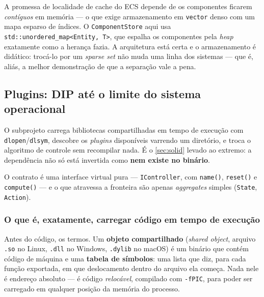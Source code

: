 \begin{armadilha}
A promessa de localidade de cache do ECS depende de os componentes ficarem
\emph{contíguos} em memória --- o que exige armazenamento em \texttt{vector}
denso com um mapa esparso de índices. O \texttt{ComponentStore} aqui usa
\texttt{std::unordered\_map<Entity, T>}, que espalha os componentes pela
\emph{heap} exatamente como a herança fazia. A arquitetura está certa e o
armazenamento é didático: trocá-lo por um \emph{sparse set} não muda uma linha
dos sistemas --- que é, aliás, a melhor demonstração de que a separação vale a
pena.
\end{armadilha}

\subsection{Plugins: DIP até o limite do sistema operacional}
\label{sec:plugin-registry}

O subprojeto  carrega bibliotecas compartilhadas em
tempo de execução com \texttt{dlopen}/\texttt{dlsym}, descobre os
\emph{plugins} disponíveis varrendo um diretório, e troca o algoritmo de
controle sem recompilar nada. É o \cref{sec:solid} levado ao extremo: a
dependência não só está invertida como \textbf{nem existe no binário}.

O contrato é uma interface virtual pura --- \texttt{IController}, com
\texttt{name()}, \texttt{reset()} e \texttt{compute()} --- e o que atravessa a
fronteira são apenas \emph{aggregates} simples (\texttt{State},
\texttt{Action}).

\subsubsection{O que é, exatamente, carregar código em tempo de execução}

Antes do código, os termos. Um \textbf{objeto compartilhado} (\emph{shared
object}, arquivo \texttt{.so} no Linux, \texttt{.dll} no Windows,
\texttt{.dylib} no macOS) é um binário que contém código de máquina e uma
\textbf{tabela de símbolos}: uma lista que diz, para cada função exportada, em
que deslocamento dentro do arquivo ela começa. Nada nele é endereço absoluto ---
é código \emph{relocável}, compilado com \texttt{-fPIC}, para poder ser
carregado em qualquer posição da memória do processo.

